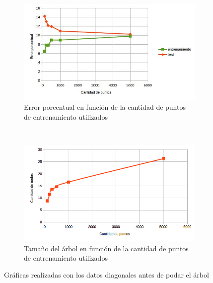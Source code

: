 \documentclass[12pt, a4paper]{article}
\begin{document}
\begin{figure}
    \centering

    \begin{subfigure}[b]{0.65\textwidth}
        \includegraphics[width=\textwidth]{errorBA}
        \caption{Error porcentual en función de la cantidad de puntos de entrenamiento utilizados}
    \end{subfigure}
      ~ %
    \begin{subfigure}[b]{0.65\textwidth}
        \includegraphics[width=\textwidth]{sizeBA}
        \caption{Tamaño del árbol en función de la cantidad de puntos de entrenamiento utilizados}
    \end{subfigure}
    \caption{Gráficas realizadas con los datos diagonales antes de podar el árbol}
\end{figure}
\end{document}
